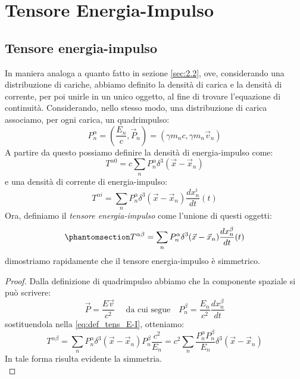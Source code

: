\section{Tensore Energia-Impulso}
\subsection{Tensore energia-impulso}
In maniera analoga a quanto fatto in sezione \ref{sec:2.2}, ove, considerando una distribuzione di cariche, abbiamo definito la densità di carica e la densità di corrente, per poi unirle in un unico oggetto, al fine di trovare l'equazione di continuità. Considerando, nello stesso modo, una distribuzione di carica associamo, per ogni carica, un quadrimpulso: 
\begin{equation}
    P^\alpha_n=\left(\dfrac{E_n}{c}, \Vec{P}_n\right)=(\gamma m_nc,\gamma m_n \Vec{v}_n)
\end{equation}
A partire da questo possiamo definire la densità di energia-impulso come:
\begin{equation}
    T^{\alpha0}=c\sum_nP^\alpha_n\delta^3(\Vec{x}-\Vec{x}_n)
\end{equation}
e una densità di corrente di energia-impulso:
\begin{equation}
    T^{\alpha i}=\sum_nP^\alpha_n\delta^3(\Vec{x}-\Vec{x}_n)\dfrac{dx^i_n}{dt}(t)
\end{equation}
Ora, definiamo il \textit{tensore energia-impulso} come l'unione di questi oggetti:
\begin{equation}\phantomsection\label{eq:def_tens_E-I}
    T^{\alpha \beta}=\sum_nP^\alpha_n\delta^3(\Vec{x}-\Vec{x}_n)\dfrac{dx^\beta_n}{dt}(t)
\end{equation}
dimostriamo rapidamente che il tensore energia-impulso è simmetrico.
\begin{proof}
    Dalla definizione di quadrimpulso abbiamo che la componente spaziale si può scrivere:
    \begin{equation}
      \Vec{P}=\dfrac{E\Vec{v}}{c^2} \quad \text{ da cui segue} \quad P^\beta_n=\dfrac{E_n}{c^2}\dfrac{dx^\beta_n}{dt}
    \end{equation}
    sostituendola nella \eqref{eq:def_tens_E-I}, otteniamo:
    \begin{equation}
    T^{\alpha \beta}=\sum_nP^\alpha_n\delta^3(\Vec{x}-\Vec{x}_n)P^\beta_n\dfrac{c^2}{E_n}=c^2\sum_n\dfrac{P^\alpha_nP^\beta_n}{E_n}\delta^3(\Vec{x}-\Vec{x}_n)
\end{equation}
In tale forma risulta evidente la simmetria.\\
\end{proof}
